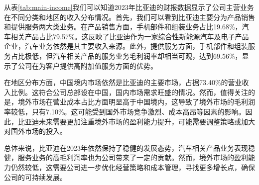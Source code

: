 从表\eqref{tab:main-income}我们可以知道2023年比亚迪的财报数据显示了公司主营业务在不同分类和地区的收入分布情况。首先，我们可以看到比亚迪主要分为产品销售和提供服务两大类业务。在产品销售方面，手机部件和组装业务占比19.68\%，汽车相关产品占比79.57\%。这反映了比亚迪作为一家综合性新能源汽车及电子产品企业，汽车业务依然是其主要收入来源。此外，提供服务方面，手机部件和组装服务占比极低，但汽车相关产品的服务业务毛利润率却相当可观，达到69.56\%，显示了公司在为客户提供高附加值服务方面的优势。

在地区分布方面，中国境内市场依然是比亚迪的主要市场，占据73.40\%的营业收入比例。这符合公司总部设在中国，国内市场需求旺盛的情况。然而，值得关注的是，境外市场在营业成本占比方面明显高于中国境内，这导致了境外市场的毛利润率较低，只有7.10\%。这可能受到国外市场竞争激烈、成本高昂等因素的影响。因此，比亚迪未来需要更加注重境外市场的盈利能力提升，可能需要调整策略或加大对国外市场的投入。

总体来说，比亚迪在2023年依然保持了稳健的发展态势，汽车相关产品业务表现稳健，服务业务的高毛利润率也为公司带来了一定的贡献。然而，境外市场的盈利能力仍然较低，这需要公司进一步优化经营策略和成本管理，寻找更多增长点，确保公司的可持续发展。